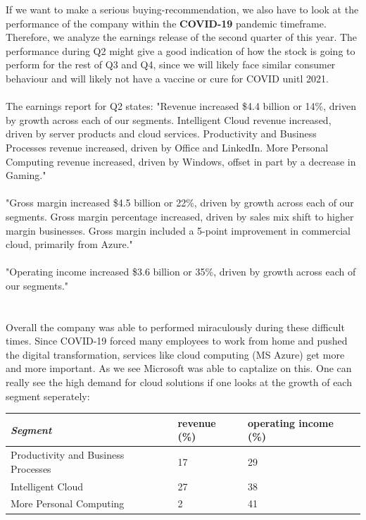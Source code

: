 \documentclass[]{article}
\begin{document}
\noindent If we want to make a serious buying-recommendation, we also have to look at the performance of the company within the \textbf{COVID-19} pandemic timeframe. Therefore, we analyze the earnings release of the second quarter of this year. The performance during Q2 might give a good indication of how the stock is going to perform for the rest of Q3 and Q4, since we will likely face similar consumer behaviour and will likely not have a vaccine or cure for COVID unitl 2021.\\\\
The earnings report for Q2 states: "Revenue increased \$4.4 billion or 14\%, driven by growth across each of our segments. Intelligent Cloud revenue increased, driven by server products and cloud services. Productivity and Business Processes revenue increased, driven by Office and LinkedIn. More Personal Computing revenue increased, driven by Windows, offset in part by a decrease in Gaming."\cite{microsoft}\\\\
"Gross margin increased \$4.5 billion or 22\%, driven by growth across each of our segments. Gross margin percentage increased, driven by sales mix shift to higher margin businesses. Gross margin included a 5-point improvement in commercial cloud, primarily from Azure."\cite{microsoft}\\\\
"Operating income increased \$3.6 billion or 35\%, driven by growth across each of our segments."\\ \cite{microsoft}\\\\
Overall the company was able to performed miraculously during these difficult times. Since COVID-19 forced many employees to work from home and pushed the digital transformation, services like cloud computing (MS Azure) get more and more important. As we see Microsoft was able to captalize on this. One can really see the high demand for cloud solutions if one looks at the growth of each segment seperately:\cite{microsoft}

\begin{table}[]
	\begin{tabular}{|l|l|l|}
		\hline
		\textit{\textbf{Segment}} & \textbf{revenue (\%)} & \textbf{operating income (\%)} \\ \hline
		Productivity and Business Processes & 17 & 29 \\ \hline
		Intelligent Cloud & 27 & 38 \\ \hline
		More Personal Computing & 2 & 41 \\ \hline
	\end{tabular}
\end{table}
\end{document}
